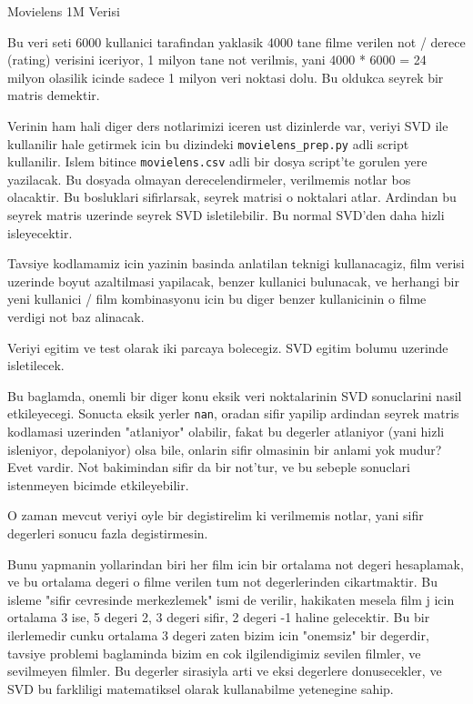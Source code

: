\documentclass[12pt,fleqn]{article}\usepackage{../common}
\begin{document}
Movielens 1M Verisi

Bu veri seti 6000 kullanici tarafindan yaklasik 4000 tane filme
verilen not / derece (rating) verisini iceriyor, 1 milyon tane not
verilmis, yani 4000 * 6000 = 24 milyon olasilik icinde sadece 1 milyon
veri noktasi dolu. Bu oldukca seyrek bir matris demektir.

Verinin ham hali diger ders notlarimizi iceren ust dizinlerde var, veriyi
SVD ile kullanilir hale getirmek icin bu dizindeki \verb!movielens_prep.py!
adli script kullanilir. Islem bitince \verb!movielens.csv! adli bir dosya
script'te gorulen yere yazilacak. Bu dosyada olmayan derecelendirmeler,
verilmemis notlar bos olacaktir. Bu bosluklari sifirlarsak, seyrek matrisi
o noktalari atlar. Ardindan bu seyrek matris uzerinde seyrek SVD
isletilebilir. Bu normal SVD'den daha hizli isleyecektir.

Tavsiye kodlamamiz icin yazinin basinda anlatilan teknigi
kullanacagiz, film verisi uzerinde boyut azaltilmasi yapilacak, benzer
kullanici bulunacak, ve herhangi bir yeni kullanici / film
kombinasyonu icin bu diger benzer kullanicinin o filme verdigi not
baz alinacak. 

Veriyi egitim ve test olarak iki parcaya bolecegiz. SVD egitim bolumu
uzerinde isletilecek.

Bu baglamda, onemli bir diger konu eksik veri noktalarinin SVD
sonuclarini nasil etkileyecegi. Sonucta eksik yerler \verb!nan!,
oradan sifir yapilip ardindan seyrek matris kodlamasi uzerinden
"atlaniyor" olabilir, fakat bu degerler atlaniyor (yani hizli
isleniyor, depolaniyor) olsa bile, onlarin sifir olmasinin bir anlami
yok mudur? Evet vardir. Not bakimindan sifir da bir not'tur, ve bu
sebeple sonuclari istenmeyen bicimde etkileyebilir.

O zaman mevcut veriyi oyle bir degistirelim ki verilmemis notlar, yani
sifir degerleri sonucu fazla degistirmesin.

Bunu yapmanin yollarindan biri her film icin bir ortalama not degeri
hesaplamak, ve bu ortalama degeri o filme verilen tum not
degerlerinden cikartmaktir. Bu isleme "sifir cevresinde merkezlemek"
ismi de verilir, hakikaten mesela film j icin ortalama 3 ise, 5 degeri
2, 3 degeri sifir, 2 degeri -1 haline gelecektir. Bu bir ilerlemedir
cunku ortalama 3 degeri zaten bizim icin "onemsiz" bir degerdir,
tavsiye problemi baglaminda bizim en cok ilgilendigimiz sevilen
filmler, ve sevilmeyen filmler. Bu degerler sirasiyla arti ve eksi
degerlere donusecekler, ve SVD bu farkliligi matematiksel olarak
kullanabilme yetenegine sahip.
\end{document}
